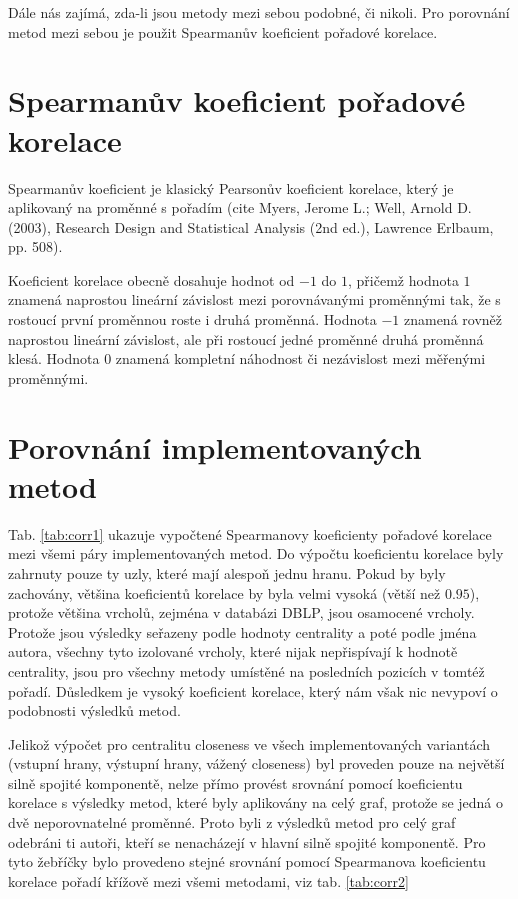 \documentclass{bakalarka}
\begin{document}
Dále nás zajímá, zda-li jsou metody mezi sebou podobné, či nikoli. Pro
porovnání metod mezi sebou je použit Spearmanův koeficient pořadové korelace.

\section{Spearmanův koeficient pořadové korelace}
Spearmanův koeficient je klasický Pearsonův koeficient korelace, který je
aplikovaný na proměnné s pořadím (cite Myers, Jerome L.; Well, Arnold D.
(2003), Research Design and Statistical Analysis (2nd ed.), Lawrence Erlbaum,
pp. 508).

Koeficient korelace obecně dosahuje hodnot od $-1$ do $1$, přičemž hodnota $1$
znamená naprostou lineární závislost mezi porovnávanými proměnnými tak, že s
rostoucí první proměnnou roste i druhá proměnná. Hodnota $-1$ znamená rovněž
naprostou lineární závislost, ale při rostoucí jedné proměnné druhá proměnná
klesá. Hodnota $0$ znamená kompletní náhodnost či nezávislost mezi měřenými
proměnnými.


\section{Porovnání implementovaných metod}
Tab. \ref{tab:corr1} ukazuje vypočtené Spearmanovy koeficienty pořadové
korelace mezi všemi páry implementovaných metod. Do výpočtu koeficientu
korelace byly zahrnuty pouze ty uzly, které mají alespoň jednu hranu. Pokud by
byly zachovány, většina koeficientů korelace by byla velmi vysoká (větší než
$0.95$), protože většina vrcholů, zejména v databázi DBLP, jsou osamocené
vrcholy. Protože jsou výsledky seřazeny podle hodnoty centrality a poté podle
jména autora, všechny tyto izolované vrcholy, které nijak nepřispívají k
hodnotě centrality, jsou pro všechny metody umístěné na posledních pozicích v
tomtéž pořadí. Důsledkem je vysoký koeficient korelace, který nám však nic
nevypoví o podobnosti výsledků metod.

Jelikož výpočet pro centralitu closeness ve všech implementovaných variantách
(vstupní hrany, výstupní hrany, vážený closeness) byl proveden pouze na
největší silně spojité komponentě, nelze přímo provést srovnání pomocí
koeficientu korelace s výsledky metod, které byly aplikovány na celý graf,
protože se jedná o dvě neporovnatelné proměnné. Proto byli z výsledků metod pro
celý graf odebráni ti autoři, kteří se nenacházejí v hlavní silně spojité
komponentě. Pro tyto žebříčky bylo provedeno stejné srovnání pomocí Spearmanova
koeficientu korelace pořadí křížově mezi všemi metodami, viz tab.
\ref{tab:corr2}
\end{document}
